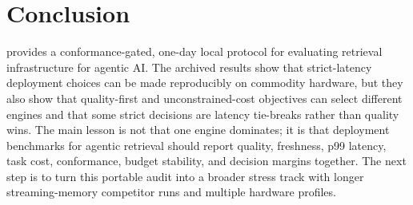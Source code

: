 \section{Conclusion}

\sys provides a conformance-gated, one-day local protocol for evaluating retrieval infrastructure for agentic AI. The archived results show that strict-latency deployment choices can be made reproducibly on commodity hardware, but they also show that quality-first and unconstrained-cost objectives can select different engines and that some strict decisions are latency tie-breaks rather than quality wins. The main lesson is not that one engine dominates; it is that deployment benchmarks for agentic retrieval should report quality, freshness, p99 latency, task cost, conformance, budget stability, and decision margins together. The next step is to turn this portable audit into a broader stress track with longer streaming-memory competitor runs and multiple hardware profiles.
